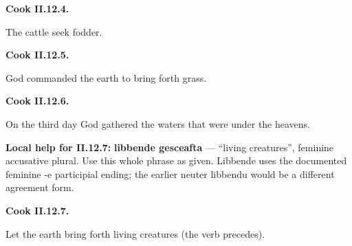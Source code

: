 \par\begin{minipage}{\linewidth}\raggedright
\textbf{Cook II.12.4.}

The cattle seek fodder.

\end{minipage}\par\addvspace{4pt}

\par\begin{minipage}{\linewidth}\raggedright
\textbf{Cook II.12.5.}

God commanded the earth to bring forth grass.

\end{minipage}\par\addvspace{4pt}

\par\begin{minipage}{\linewidth}\raggedright
\textbf{Cook II.12.6.}

On the third day God gathered the waters that were under the heavens.

\end{minipage}\par\addvspace{4pt}

\textbf{Local help for II.12.7:} \textbf{libbende gesceafta} — “living creatures”, feminine accusative plural. Use this whole phrase as given. Libbende uses the documented feminine -e participial ending; the earlier neuter libbendu would be a different agreement form.

\par\begin{minipage}{\linewidth}\raggedright
\textbf{Cook II.12.7.}

Let the earth bring forth living creatures (the verb precedes).

\end{minipage}\par\addvspace{4pt}

